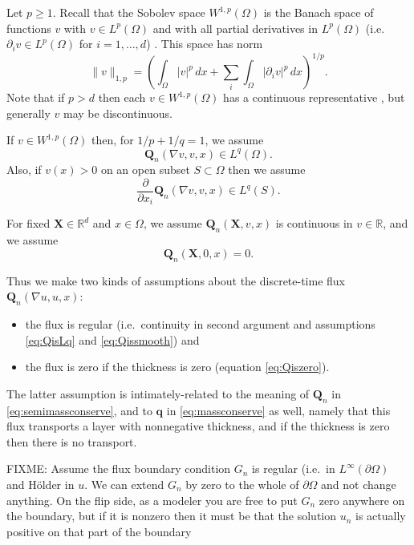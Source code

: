 \documentclass[final,leqno,onefignum,onetabnum]{siamltex1213bueler}
\newcommand\bq{\mathbf{q}}
\newcommand\bQ{\mathbf{Q}}
\newcommand\bX{\mathbf{X}}
\renewcommand{\grad}{\nabla}
\newcommand\RR{\mathbb{R}}
\begin{document}
Let $p\ge 1$.  Recall that the Sobolev space $W^{1,p}(\Omega)$ is the Banach space of functions $v$ with $v\in L^p(\Omega)$ and with all partial derivatives in $L^p(\Omega)$ (i.e.~$\partial_i v \in L^p(\Omega)$ for $i=1,\dots,d$) \cite{Evans}.  This space has norm
    $$\|v\|_{1,p} = \left(\int_\Omega |v|^p\,dx + \sum_i \int_\Omega |\partial_i v|^p\,dx\right)^{1/p}.$$
Note that if $p>d$ then each $v\in W^{1,p}(\Omega)$ has a continuous representative \cite[``Morrey's inequality'']{Evans}, but generally $v$ may be discontinuous.

If $v \in W^{1,p}(\Omega)$ then, for $1/p + 1/q = 1$, we assume
\begin{equation}
\bQ_n(\grad v,v,x) \in L^q(\Omega). \label{eq:QisLq}
\end{equation}
Also, if $v(x)>0$ on an open subset $S\subset \Omega$ then we assume
\begin{equation}
\frac{\partial}{\partial x_i} \bQ_n(\grad v,v,x) \in L^q(S). \label{eq:Qissmooth}
\end{equation}

For fixed $\bX\in\RR^d$ and $x\in \Omega$, we assume $\bQ_n(\bX,v,x)$ is continuous in $v\in\RR$, and we assume
\begin{equation}
\bQ_n(\bX,0,x)=0. \label{eq:Qiszero}
\end{equation}

Thus we make two kinds of assumptions about the discrete-time flux $\bQ_n(\grad u,u,x)$: \begin{itemize}
\item the flux is regular (i.e.~continuity in second argument and assumptions \eqref{eq:QisLq} and \eqref{eq:Qissmooth}) and
\item the flux is zero if the thickness is zero (equation \eqref{eq:Qiszero}).
\end{itemize}
The latter assumption is intimately-related to the meaning of $\bQ_n$ in \eqref{eq:semimassconserve}, and to $\bq$ in \eqref{eq:massconserve} as well, namely that this flux transports a layer with nonnegative thickness, and if the thickness is zero then there is no transport.

FIXME: Assume the flux boundary condition $G_n$ is regular (i.e.~in $L^\infty(\partial\Omega)$ and H\"older in $u$.  We can extend $G_n$ by zero to the whole of $\partial \Omega$ and not change anything.  On the flip side, as a modeler you are free to put $G_n$ zero anywhere on the boundary, but if it is nonzero then it must be that the solution $u_n$ is actually positive on that part of the boundary
\end{document}
